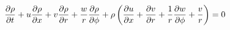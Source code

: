 \begin{equation}
  \pdv{\rho}{t}  
  + u\pdv{\rho}{x}
  + v\pdv{\rho}{r} 
  + \frac{w}{r}\pdv{\rho}{\phi}
  + \rho\left(\pdv{u}{x}
  + \pdv{v}{r} 
  + \frac{1}{r}\pdv{w}{\phi} 
  + \frac{v}{r} \right) = 0
\end{equation}

